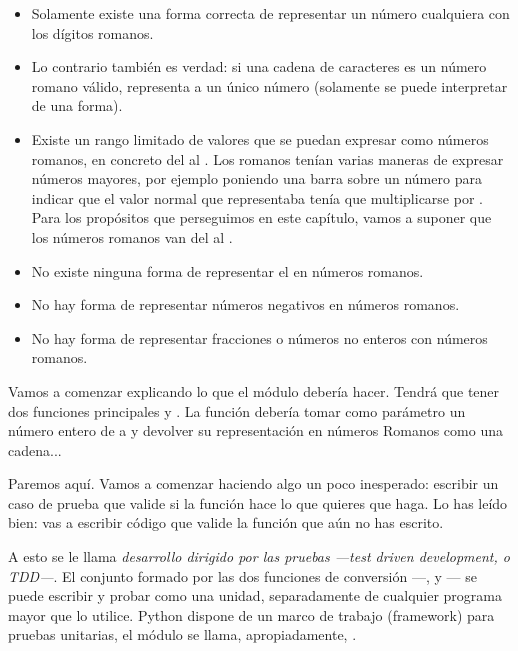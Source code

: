 \begin{itemize}

\item Solamente existe una forma correcta de representar un número cualquiera con los dígitos romanos.

\item Lo contrario también es verdad: si una cadena de caracteres es un número romano válido, representa a un único número (solamente se puede interpretar de una forma).

\item Existe un rango limitado de valores que se puedan expresar como números romanos, en concreto del  al . Los romanos tenían varias maneras de expresar números mayores, por ejemplo poniendo una barra sobre un número para indicar que el valor normal que representaba tenía que multiplicarse por . Para los propósitos que perseguimos en este capítulo, vamos a suponer que los números romanos van del  al . 

\item No existe ninguna forma de representar el  en números romanos.

\item No hay forma de representar números negativos en números romanos.

\item No hay forma de representar fracciones o números no enteros con números romanos.

\end{itemize}

Vamos a comenzar explicando lo que el módulo  debería hacer. Tendrá que tener dos funciones principales  y . La función  debería tomar como parámetro un número entero de  a  y devolver su representación en números Romanos como una cadena...

Paremos aquí. Vamos a comenzar haciendo algo un poco inesperado: escribir un caso de prueba que valide si la función  hace lo que quieres que haga. Lo has leído bien: vas a escribir código que valide la función que aún no has escrito.

A esto se le llama \emph{desarrollo dirigido por las pruebas ---test driven development, o TDD---}. El conjunto formado por las dos funciones de conversión ---, y --- se puede escribir y probar como una unidad, separadamente de cualquier programa mayor que lo utilice. Python dispone de un marco de trabajo (framework) para pruebas unitarias, el módulo se llama, apropiadamente, .

